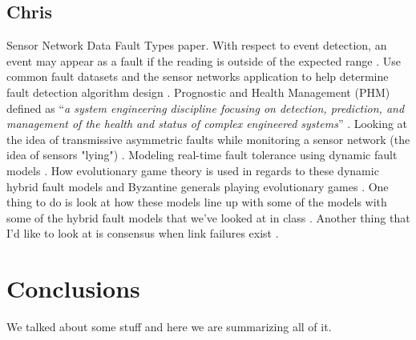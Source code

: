 \documentclass[twoside, conference]{IEEEtran}
\begin{document}
\subsection{Chris}
Sensor Network Data Fault Types paper\cite{Ni2009}.  With respect to event detection, an event may appear as a fault if the reading is outside of the expected range \cite[p. 25:5]{Ni2009}.  Use common fault datasets and the sensor networks application to help determine fault detection algorithm design \cite[p. 25:7]{Ni2009}.  Prognostic and Health Management (PHM) defined as ``\textit{a system engineering discipline focusing on detection, prediction, and management of the health and status of complex engineered systems}'' \cite[p. 1]{Ma2009}.  Looking at the idea of transmissive asymmetric faults while monitoring a sensor network (the idea of sensors "lying") \cite[p. 4]{Ma2009}.  Modeling real-time fault tolerance using dynamic fault models \cite[p. 4]{Ma2009}\cite{Ma2008}.  How evolutionary game theory is used in regards to these dynamic hybrid fault models \cite[p. 6]{Ma2009} and Byzantine generals playing evolutionary games \cite[p. 11,15]{Ma2009}.  One thing to do is look at how these models line up with some of the models with some of the hybrid fault models that we've looked at in class \cite{Azadmanesh2000}.  Another thing that I'd like to look at is consensus when link failures exist \cite{Biely2011}.

\section{Conclusions}\label{sec:conclusions}
We talked about some stuff and here we are summarizing all of it.



\end{document}
